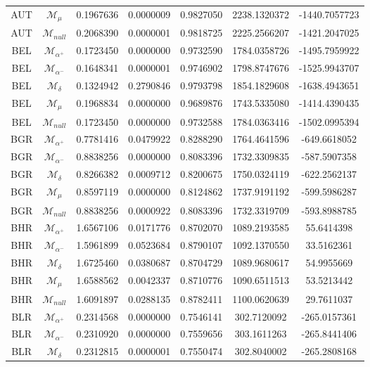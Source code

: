 \begin{tabular}{ccccccc}
AUT & $\mathcal{M}_{\mu}$ & 0.1967636 & 0.0000009 & 0.9827050 & 2238.1320372 & -1440.7057723\\
AUT & $\mathcal{M}_{null}$ & 0.2068390 & 0.0000001 & 0.9818725 & 2225.2566207 & -1421.2047025\\
BEL & $\mathcal{M}_{\alpha^+}$ & 0.1723450 & 0.0000000 & 0.9732590 & 1784.0358726 & -1495.7959922\\
BEL & $\mathcal{M}_{\alpha^-}$ & 0.1648341 & 0.0000001 & 0.9746902 & 1798.8747676 & -1525.9943707\\
BEL & $\mathcal{M}_{\delta}$ & 0.1324942 & 0.2790846 & 0.9793798 & 1854.1829608 & -1638.4943651\\
BEL & $\mathcal{M}_{\mu}$ & 0.1968834 & 0.0000000 & 0.9689876 & 1743.5335080 & -1414.4390435\\
BEL & $\mathcal{M}_{null}$ & 0.1723450 & 0.0000000 & 0.9732588 & 1784.0363416 & -1502.0995394\\
BGR & $\mathcal{M}_{\alpha^+}$ & 0.7781416 & 0.0479922 & 0.8288290 & 1764.4641596 & -649.6618052\\
BGR & $\mathcal{M}_{\alpha^-}$ & 0.8838256 & 0.0000000 & 0.8083396 & 1732.3309835 & -587.5907358\\
BGR & $\mathcal{M}_{\delta}$ & 0.8266382 & 0.0009712 & 0.8200675 & 1750.0324119 & -622.2562137\\
BGR & $\mathcal{M}_{\mu}$ & 0.8597119 & 0.0000000 & 0.8124862 & 1737.9191192 & -599.5986287\\
BGR & $\mathcal{M}_{null}$ & 0.8838256 & 0.0000922 & 0.8083396 & 1732.3319709 & -593.8988785\\
BHR & $\mathcal{M}_{\alpha^+}$ & 1.6567106 & 0.0171776 & 0.8702070 & 1089.2193585 & 55.6414398\\
BHR & $\mathcal{M}_{\alpha^-}$ & 1.5961899 & 0.0523684 & 0.8790107 & 1092.1370550 & 33.5162361\\
BHR & $\mathcal{M}_{\delta}$ & 1.6725460 & 0.0380687 & 0.8704729 & 1089.9680617 & 54.9955669\\
BHR & $\mathcal{M}_{\mu}$ & 1.6588562 & 0.0042337 & 0.8710776 & 1090.6511513 & 53.5213442\\
BHR & $\mathcal{M}_{null}$ & 1.6091897 & 0.0288135 & 0.8782411 & 1100.0620639 & 29.7611037\\
BLR & $\mathcal{M}_{\alpha^+}$ & 0.2314568 & 0.0000000 & 0.7546141 & 302.7120092 & -265.0157361\\
BLR & $\mathcal{M}_{\alpha^-}$ & 0.2310920 & 0.0000000 & 0.7559656 & 303.1611263 & -265.8441406\\
BLR & $\mathcal{M}_{\delta}$ & 0.2312815 & 0.0000001 & 0.7550474 & 302.8040002 & -265.2808168\\

\end{tabular}
